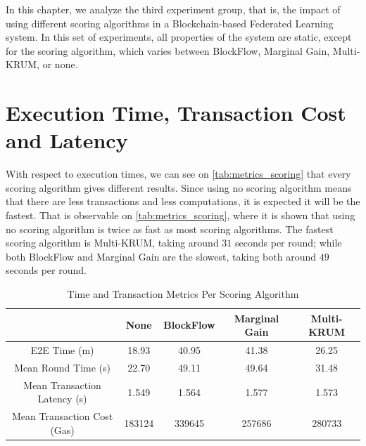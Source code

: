 In this chapter, we analyze the third experiment group, that is, the impact of using different scoring algorithms in a Blockchain-based Federated Learning system. In this set of experiments, all properties of the system are static, except for the scoring algorithm, which varies between BlockFlow, Marginal Gain, Multi-KRUM, or none.

\section{Execution Time, Transaction Cost and Latency}

With respect to execution times, we can see on \autoref{tab:metrics_scoring} that every scoring algorithm gives different results. Since using no scoring algorithm means that there are less transactions and less computations, it is expected it will be the fastest. That is observable on \autoref{tab:metrics_scoring}, where it is shown that using no scoring algorithm is twice as fast as most scoring algorithms. The fastest scoring algorithm is Multi-KRUM, taking around $31$ seconds per round; while both BlockFlow and Marginal Gain are the slowest, taking both around $49$ seconds per round.

\begin{table}[!ht]
\centering
\begin{tabular}{c|c|c|c|c} \hline \hline
                               & None   & BlockFlow & Marginal Gain & Multi-KRUM \\ \hline \hline
E2E Time (m)                   & 18.93  & 40.95     & 41.38         & 26.25      \\ \hline
Mean Round Time (s)            & 22.70  & 49.11     & 49.64         & 31.48      \\ \hline
Mean Transaction Latency (s)   & 1.549  & 1.564     & 1.577         & 1.573      \\ \hline
Mean Transaction Cost (Gas)    & 183124 & 339645    & 257686        & 280733     \\ \hline
\end{tabular}
\caption{Time and Transaction Metrics Per Scoring Algorithm}
\label{tab:metrics_scoring}
\end{table}

